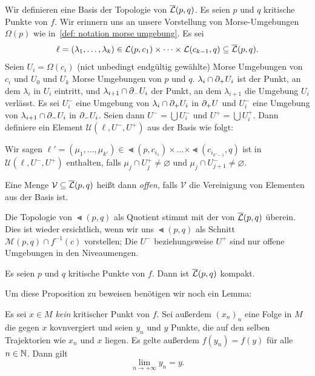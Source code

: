 \begin{definition}
    \label{def: topologie gebrochener trajektorien}
    Wir definieren eine Basis der Topologie von ${\overline{\mathcal{L}} } (p, q)$. Es seien $p$ und $q$ kritische 
    Punkte von $f$. Wir erinnern uns an unsere Vorstellung von Morse-Umgebungen $\Omega(p)$ wie 
    in~\ref{def: notation morse umgebung}.
    Es sei
    \[ \ell = (\lambda_1, \dots, \lambda_k) 
        \in { \mathcal{L} } (p, c_1) \times \dots \times { \mathcal{L} }(c_{k - 1}, q) \subseteq {\overline{\mathcal{L}} } (p, q) . \]
    Seien $U_i = \Omega(c_i)$ (nict unbedingt endgültig gewählte) Morse Umgebungen von $c_i$ 
    und $U_0$ und $U_k$ Morse Umgebungen von $p$ und $q$. $\lambda_i \cap { \partial }_+ U_i$ ist der 
    Punkt, an dem $\lambda_i$ in $U_i$ eintritt, und $\lambda_{i + 1} \cap { \partial }_- U_i$ der 
    Punkt, an dem $\lambda_{i + 1}$ die Umgebung $U_i$ verlässt. Es sei $U_i^-$ eine Umgebung von 
    $\lambda_i \cap { \partial }_+ U_i$ in 
    ${ \partial }_+ U$ und $U_i^-$ eine Umgebung von $\lambda_{i + 1} \cap { \partial }_- U_i$ in ${ \partial }_- U_i$. 
    Seien dann $U^- = \bigcup U_i^-$ und $U^+ = \bigcup U_i^+$. Dann definiere ein Element
    $\mathcal{U} (\ell, U^-, U^+)$ aus der Basis wie folgt:

    Wir sagen 
    $\ell' = (\mu_1, ..., \mu_{k'}) \in \Lt (p, c_{i_1}) \times \dots \times \Lt (c_{i_{k'-1}}, q)$
    ist in $\mathcal{U}(\ell, U^-, U^+)$ enthalten, falls $\mu_j \cap U_j^+ \neq \varnothing$
    und $\mu_j \cap U_{j + 1}^- \neq \varnothing$. 

    Eine Menge $\mathcal{V} \subseteq {\overline{\mathcal{L}} } (p, q)$ heißt dann \textit{offen}, falls $\mathcal{V}$
    die Vereinigung von Elementen aus der Basis ist.
\end{definition}

\begin{remark}
    Die Topologie von $\Lt(p, q)$ als Quotient stimmt mit der von ${\overline{\mathcal{L}} }(p, q)$ überein.
    Dies ist wieder ersichtlich, wenn wir uns $\Lt (p, q)$ als Schnitt 
    $\mathcal{M} (p, q) \cap f^{-1}(c)$ vorstellen; Die $U^-$ beziehungsweise $U^+$ sind nur 
    offene Umgebungen in den Niveaumengen.
\end{remark}

\begin{prop}
    \label{prop: Lb ist kompakt}
    Es seien $p$ und $q$ kritische Punkte von $f$. Dann ist ${\overline{\mathcal{L}} } (p, q)$ kompakt.
\end{prop}

Um diese Proposition zu beweisen benötigen wir noch ein Lemma:

\begin{lemma}
    \label{lemma: konvergenz einer folge}
    Es sei $x \in M$ \emph{kein} kritischer Punkt von $f$. Sei außerdem $(x_n)_n$ eine Folge in
    $M$ die gegen $x$ kovnvergiert und seien $y_n$ und $y$ Punkte, die auf den selben Trajektorien
    wie $x_n$ und $x$ liegen. Es gelte außerdem $f(y_n) = f(y)$ für alle $n \in { \mathbb N }$. Dann gilt
    \[ \lim_{n \to + \infty} y_n = y . \]
\end{lemma}


